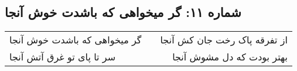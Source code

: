 \begin{center}
\section*{شماره ۱۱: گر میخواهی که باشدت خوش آنجا}
\label{sec:011}
\begin{longtable}{l p{0.5cm} r}
گر میخواهی که باشدت خوش آنجا
&&
از تفرقه پاک رخت جان کش آنجا
\\
سر تا پای تو غرق آتش آنجا
&&
بهتر بودت که دل مشوش آنجا
\\
\end{longtable}
\end{center}
